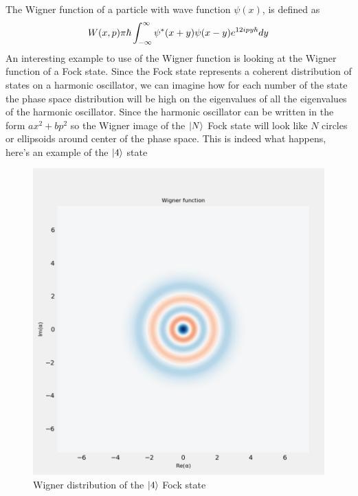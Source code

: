 \documentclass[english, a4paper, 12pt, twoside]{article}
\numberwithin{equation}{section} %
\begin{document}
The Wigner function of a particle with wave function $\psi(x)$, is defined as 
\[
    W(x, p) \def \frac{1}{\pi \hbar} \int_{-\infty}^\infty \psi^*(x + y) \psi(x - y) e^{\frac{2ipy}{\hbar}} dy
\]
An interesting example to use of the Wigner function is looking at the Wigner function of a Fock state. Since the Fock state represents a coherent distribution of states on a harmonic oscillator, we can imagine how for each number of the state the phase space distribution will be high on the eigenvalues of all the eigenvalues of the harmonic oscillator. Since the harmonic oscillator can be written in the form $a x^2 + b p^2$ so the Wigner image of the $\ket{N}$ Fock state will look like $N$ circles or ellipsoids around center of the phase space. This is indeed what happens, here's an example of the $\ket{4}$ state
\begin{figure}[H]
    \centering
    \includegraphics[width=0.5\columnwidth]{Wigner.png}
    \caption{Wigner distribution of the $\ket{4}$ Fock state}
    \label{fig:Fock-State-Wigner}
\end{figure}






\end{document}
